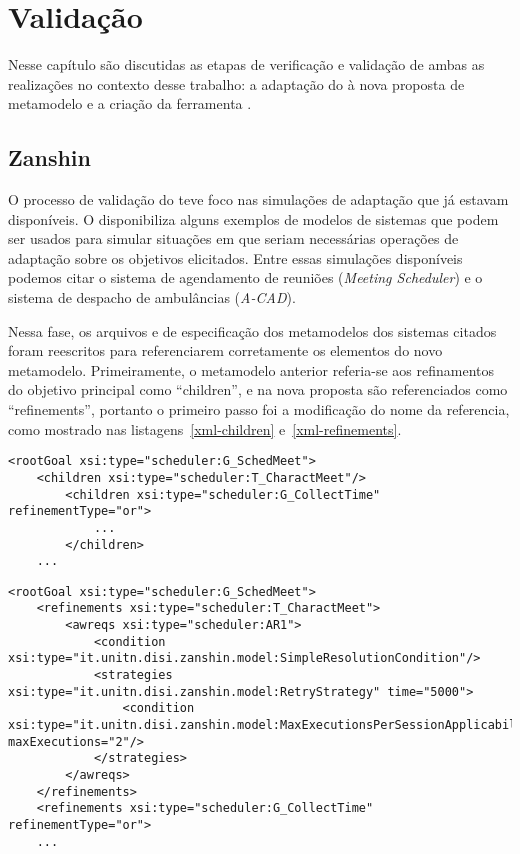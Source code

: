 
\chapter{Validação}
\label{sec-validacao}

Nesse capítulo são discutidas as etapas de verificação e validação de ambas as realizações no contexto desse trabalho: a adaptação do \zanshin à nova proposta de metamodelo e a criação da ferramenta \unagi.

\section{Zanshin}
\label{sec-validacao-zanshin}

O processo de validação do \zanshin teve foco nas simulações de adaptação que já estavam disponíveis. O \framework disponibiliza alguns  exemplos de modelos de sistemas que podem ser usados para simular situações em que  seriam necessárias operações de adaptação sobre os objetivos elicitados. Entre essas simulações disponíveis podemos citar o sistema de agendamento de reuniões (\textit{Meeting Scheduler}) e o sistema de despacho de ambulâncias (\textit{A-CAD}).

Nessa fase, os arquivos \ecore e \xml de especificação dos metamodelos dos sistemas citados foram reescritos para referenciarem corretamente os elementos do novo metamodelo. Primeiramente, o metamodelo anterior referia-se aos refinamentos do objetivo principal como ``children'', e na nova proposta são referenciados como ``refinements'', portanto o primeiro passo foi a modificação do nome da referencia, como mostrado nas listagens~\ref{xml-children} e~\ref{xml-refinements}. 

\begin{lstlisting}[caption={Trecho de XML representando o A-CAD no metamodelo antigo},label={xml-children}]
<rootGoal xsi:type="scheduler:G_SchedMeet">
	<children xsi:type="scheduler:T_CharactMeet"/>
		<children xsi:type="scheduler:G_CollectTime" refinementType="or">
			...
		</children>
	...
\end{lstlisting}

\begin{lstlisting}[caption={Trecho de XML representando o A-CAD no novo metamodelo},label={xml-refinements}]
<rootGoal xsi:type="scheduler:G_SchedMeet">
	<refinements xsi:type="scheduler:T_CharactMeet">
		<awreqs xsi:type="scheduler:AR1">
			<condition xsi:type="it.unitn.disi.zanshin.model:SimpleResolutionCondition"/>
			<strategies xsi:type="it.unitn.disi.zanshin.model:RetryStrategy" time="5000">
				<condition xsi:type="it.unitn.disi.zanshin.model:MaxExecutionsPerSessionApplicabilityCondition" maxExecutions="2"/>
			</strategies>
		</awreqs>
	</refinements>
	<refinements xsi:type="scheduler:G_CollectTime" refinementType="or">
	...
\end{lstlisting}

